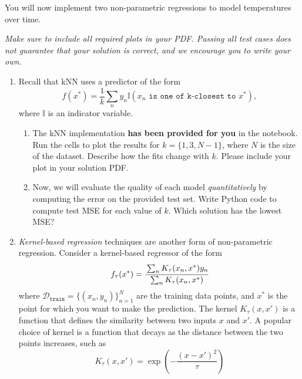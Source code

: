 \documentclass[submit]{../harvardml}
\begin{document}
\begin{problem}

You will now implement two non-parametric regressions to model temperatures over time.  

\vspace{0.5cm}
\noindent\emph{Make sure to include all required plots in your PDF. Passing all test cases does not guarantee that your solution is correct, and we encourage you to write your own. }

\begin{enumerate}
\item 
 Recall that kNN uses a predictor of the form
\[
  f(x^*) = \frac{1}{k} \sum_n y_n \mathbb{I}(x_n \texttt{ is one of k-closest to } x^*),
\]
where $\mathbb{I}$ is an indicator variable. 
\begin{enumerate}

  \item The kNN implementation \textbf{has been provided for you} in the notebook. Run the cells to plot the results for $k=\{1, 3, N-1\}$, where $N$ is the size of the dataset. Describe how the fits change with $k$. Please include your plot in your solution PDF.

  \item Now, we will evaluate the quality of each model \emph{quantitatively} by computing the error on the provided test set. Write Python code to compute test MSE for each value of $k$.  Which solution has the lowest MSE? 
  
\end{enumerate}

\item \textit{Kernel-based regression} techniques are another form of non-parametric regression. Consider a kernel-based
regressor of the form 
\begin{equation*}
  f_\tau(x^*) = \cfrac{\sum_{n} K_\tau(x_n,x^*) y_n}{\sum_n K_\tau(x_n, x^*)}
\end{equation*}
where $\mathcal{D}_\texttt{train} = \{(x_n,y_n)\}_{n = 1} ^N$ are the
training data points, and $x^*$ is the point for which you want to
make the prediction.  The kernel $K_\tau(x,x')$ is a function that
defines the similarity between two inputs $x$ and $x'$. A popular
choice of kernel is a function that decays as the distance between the
two points increases, such as
\begin{equation*}
  K_\tau(x,x') = \exp\left(-\frac{(x-x')^2}{\tau}\right)
\end{equation*}


\end{enumerate}
\end{problem}
\end{document}
